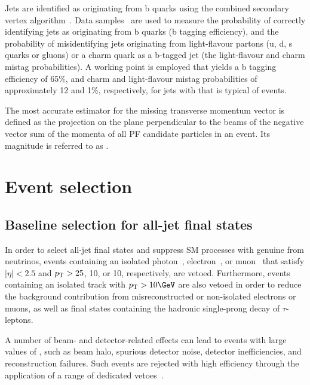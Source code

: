 Jets are identified as originating from b quarks using the combined
secondary vertex algorithm~\cite{CMS-PAS-BTV-12-001}. Data
samples~\cite{bjets} are used to measure the probability of correctly
identifying jets as originating from b quarks (b tagging efficiency),
and the probability of misidentifying jets originating from
light-flavour partons (u, d, s quarks or gluons) or a charm quark as a
b-tagged jet (the light-flavour and charm mistag probabilities). A
working point is employed that yields a b tagging efficiency of 65\%,
and charm and light-flavour mistag probabilities of approximately 12
and 1\%, respectively, for jets with \pt that is typical of \ttbar
events.

The most accurate estimator for the missing transverse momentum vector
\ptvecmiss is defined as the projection on the plane perpendicular to
the beams of the negative vector sum of the momenta of all PF
candidate particles in an event. Its magnitude is referred to as
\met.


\section{Event selection}
\label{sec:selection}

\subsection{Baseline selection for all-jet final states}

In order to select all-jet final states and suppress SM processes with
genuine \ptvecmiss from neutrinos, events containing an isolated
photon~\cite{PAS-EGM-10-006}, electron~\cite{PAS-EGM-10-004}, or
muon~\cite{PAS-MUO-10-004} that satisfy $|\eta| < 2.5$ and ${p_{\text T}} > 25$,
10, or 10\GeV, respectively, are vetoed. Furthermore, events
containing an isolated track with $\Pt > 10\GeV$ are also vetoed in
order to reduce the background contribution from misreconstructed or
non-isolated electrons or muons, as well as final states containing
the hadronic single-prong decay of $\tau$-leptons. 

A number of beam- and detector-related effects can lead to events with
large values of \met, such as beam halo, spurious detector noise,
detector inefficiencies, and reconstruction failures. Such events are
rejected with high efficiency through the application of a range of
dedicated vetoes~\cite{RA1Paper2012, cms-met}. 

